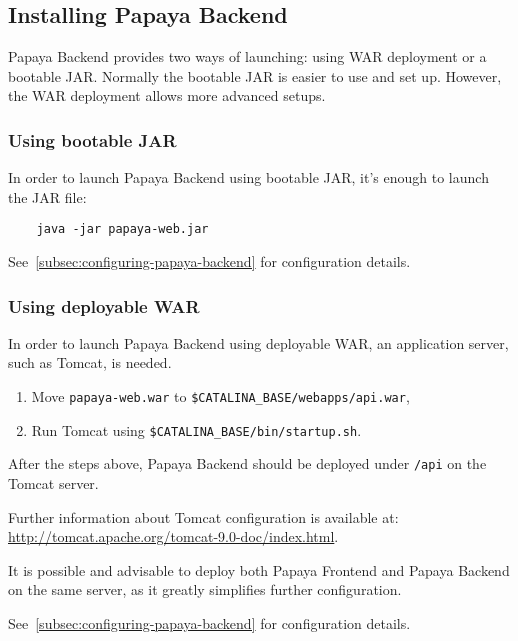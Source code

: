 \subsection{Installing Papaya Backend}\label{subsec:installing-papaya-backend}

Papaya Backend provides two ways of launching: using WAR deployment or
a bootable JAR\@.
Normally the bootable JAR is easier to use and set up.
However, the WAR deployment allows more advanced setups.

\subsubsection{Using bootable JAR}

In order to launch Papaya Backend using bootable JAR, it's enough to launch
the JAR file:

\begin{lstlisting}
    java -jar papaya-web.jar
\end{lstlisting}

See~\ref{subsec:configuring-papaya-backend} for configuration details.


\subsubsection{Using deployable WAR}

In order to launch Papaya Backend using deployable WAR, an application server,
such as Tomcat, is needed.

\begin{enumerate}
    \item Move \texttt{papaya-web.war} to
    \texttt{\$CATALINA\_BASE/webapps/api.war},

    \item Run Tomcat using \texttt{\$CATALINA\_BASE/bin/startup.sh}.
\end{enumerate}

After the steps above, Papaya Backend should be deployed under \texttt{/api}
on the Tomcat server.

Further information about Tomcat configuration is available at:
\url{http://tomcat.apache.org/tomcat-9.0-doc/index.html}.

It is possible and advisable to deploy both Papaya Frontend and Papaya Backend
on the same server, as it greatly simplifies further configuration.

See~\ref{subsec:configuring-papaya-backend} for configuration details.



